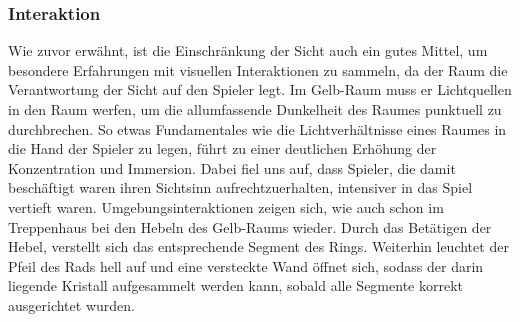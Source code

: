 \subsubsection{Interaktion}
Wie zuvor erwähnt, ist die Einschränkung der Sicht auch ein gutes Mittel, um besondere Erfahrungen mit visuellen Interaktionen zu sammeln, da der Raum die Verantwortung der Sicht auf den Spieler legt. Im Gelb-Raum muss er Lichtquellen in den Raum werfen, um die allumfassende Dunkelheit des Raumes punktuell zu durchbrechen. So etwas Fundamentales wie die Lichtverhältnisse eines Raumes in die Hand der Spieler zu legen, führt zu einer deutlichen Erhöhung der Konzentration und Immersion. Dabei fiel uns auf, dass Spieler, die damit beschäftigt waren ihren Sichtsinn aufrechtzuerhalten, intensiver in das Spiel vertieft waren.
Umgebungsinteraktionen zeigen sich, wie auch schon im Treppenhaus bei den Hebeln des Gelb-Raums wieder. Durch das Betätigen der Hebel, verstellt sich das entsprechende Segment des Rings. Weiterhin leuchtet der Pfeil des Rads hell auf und eine versteckte Wand öffnet sich, sodass der darin liegende Kristall aufgesammelt werden kann, sobald alle Segmente korrekt ausgerichtet wurden.

\newpage \noindent

